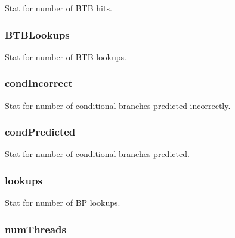 \label{classBPredUnit_a62943c2b7168001cfb6cf5f3a724e04a}
Stat for number of BTB hits. \hypertarget{classBPredUnit_aa62bafdbd09ec7c26031a8b58a042569}{
\subsubsection[{BTBLookups}]{ {\bf BTBLookups}}}
\label{classBPredUnit_aa62bafdbd09ec7c26031a8b58a042569}
Stat for number of BTB lookups. \hypertarget{classBPredUnit_a185c5e4f3b5ec64fe7a1120ead854d93}{
\subsubsection[{condIncorrect}]{ {\bf condIncorrect}}}
\label{classBPredUnit_a185c5e4f3b5ec64fe7a1120ead854d93}
Stat for number of conditional branches predicted incorrectly. \hypertarget{classBPredUnit_a5c78c3319018e9949a36e46bfe617905}{
\subsubsection[{condPredicted}]{ {\bf condPredicted}}}
\label{classBPredUnit_a5c78c3319018e9949a36e46bfe617905}
Stat for number of conditional branches predicted. \hypertarget{classBPredUnit_a4a025c8c15499fd8df40b46f39496321}{
\subsubsection[{lookups}]{ {\bf lookups}}}
\label{classBPredUnit_a4a025c8c15499fd8df40b46f39496321}
Stat for number of BP lookups. \hypertarget{classBPredUnit_a82dc714137537bc6ed526164d95f6674}{
\subsubsection[{numThreads}]{ {\bf numThreads}}}
